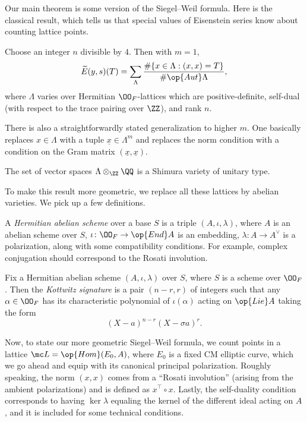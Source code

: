 \documentclass{article}
\begin{document}
Our main theorem is some version of the Siegel--Weil formula. Here is the classical result, which tells us that special values of Eisenstein series know about counting lattice points.
\begin{theorem}
	Choose an integer $n$ divisible by $4$. Then with $m=1$,
	\[\widetilde E(y,s)(T)=\sum_{\Lambda}\frac{\#\{x\in\Lambda:(x,x)=T\}}{\#\op{Aut}\Lambda},\]
	where $\Lambda$ varies over Hermitian $\OO_F$-lattices which are positive-definite, self-dual (with respect to the trace pairing over $\ZZ$), and rank $n$.
\end{theorem}
\begin{remark}
	There is also a straightforwardly stated generalization to higher $m$. One basically replaces $x\in\Lambda$ with a tuple $\underline x\in\Lambda^m$ and replaces the norm condition with a condition on the Gram matrix $(\underline x,\underline x)$.
\end{remark}
\begin{remark}
	The set of vector spaces $\Lambda\otimes_\ZZ\QQ$ is a Shimura variety of unitary type.
\end{remark}
To make this result more geometric, we replace all these lattices by abelian varieties. We pick up a few definitions.
\begin{definition}
	A \textit{Hermitian abelian scheme} over a base $S$ is a triple $(A,\iota,\lambda)$, where $A$ is an abelian scheme over $S$, $\iota\colon\OO_F\to\op{End}A$ is an embedding, $\lambda\colon A\to A^\lor$ is a polarization, along with some compatibility conditions. For example, complex conjugation should correspond to the Rosati involution.
\end{definition}
\begin{definition}
	Fix a Hermitian abelian scheme $(A,\iota,\lambda)$ over $S$, where $S$ is a scheme over $\OO_F$. Then the \textit{Kottwitz signature} is a pair $(n-r,r)$ of integers such that any $\alpha\in\OO_F$ has its characteristic polynomial of $\iota(\alpha)$ acting on $\op{Lie}A$ taking the form
	\[(X-a)^{n-r}(X-\sigma a)^r.\]
\end{definition}
Now, to state our more geometric Siegel--Weil formula, we count points in a lattice $\mc L=\op{Hom}(E_0,A)$, where $E_0$ is a fixed CM elliptic curve, which we go ahead and equip with its canonical principal polarization. Roughly speaking, the norm $(x,x)$ comes from a ``Rosati involution'' (arising from the ambient polarizations) and is defined as $x^\intercal\circ x$. Lastly, the self-duality condition corresponds to having $\ker\lambda$ equaling the kernel of the different ideal acting on $A$, and it is included for some technical conditions.
\end{document}
